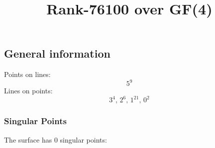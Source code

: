 \documentclass{article}
\newcommand\setTBstruts{\def\T{\rule{0pt}{2.6ex}}%
\def\B{\rule[-1.2ex]{0pt}{0pt}}}
\begin{document}
 
\setTBstruts



{\allowdisplaybreaks%






\title{Rank-76100 over GF(4)}
\author{}%
\maketitle%
%
{}



\subsection*{General information}
Points on lines:
$$
5^9$$
Lines on points:
$$
3^4,\,2^6,\,1^{21},\,0^2$$
\subsubsection*{Singular Points}
The surface has 0 singular points:\\
\begin{align*}
\end{align*}
}
\end{document}
